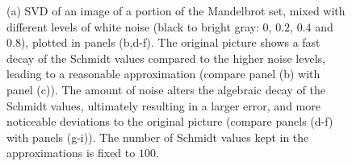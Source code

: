 \begin{figure}
    \caption{(a) SVD of an image of a portion of the Mandelbrot set, mixed with different levels of white noise (black to bright gray: $0$, $0.2$, $0.4$ and $0.8$), plotted in panels (b,d-f).
    The original picture shows a fast decay of the Schmidt values compared to the higher noise levels, leading to a reasonable approximation (compare panel (b) with panel (c)). The amount of noise alters the algebraic decay of the Schmidt values, ultimately resulting in a larger error, and more noticeable deviations to the original picture (compare panels (d-f) with panels (g-i)). The number of Schmidt values kept in the approximations is fixed to $100$.}
    \label{fig:svd_image_compression_mandelbrot}
\end{figure}

